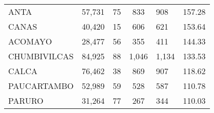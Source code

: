 \begin{tabular}{lrcclr}
	\cellcolor[HTML]{FFFF99}ANTA                                   & 57,731                                                         & 75                                                         & 833                  & 908                                                                 & 157.28                                                                       \\
	\cellcolor[HTML]{FFFF99}CANAS                                  & 40,420                                                         & 15                                                         & 606                  & 621                                                                 & 153.64                                                                       \\
	\cellcolor[HTML]{C6E0B4}ACOMAYO                                & 28,477                                                         & 56                                                         & 355                  & 411                                                                 & 144.33                                                                       \\
	\cellcolor[HTML]{C6E0B4}CHUMBIVILCAS                           & 84,925                                                         & 88                                                         & 1,046                & 1,134                                                               & 133.53                                                                       \\
	\cellcolor[HTML]{C6E0B4}CALCA                                  & 76,462                                                         & 38                                                         & 869                  & 907                                                                 & 118.62                                                                       \\
	\cellcolor[HTML]{C6E0B4}PAUCARTAMBO                            & 52,989                                                         & 59                                                         & 528                  & 587                                                                 & 110.78                                                                       \\
	\cellcolor[HTML]{C6E0B4}PARURO                                 & 31,264                                                         & 77                                                         & 267                  & 344                                                                 & 110.03                                                                       \\

\end{tabular}

